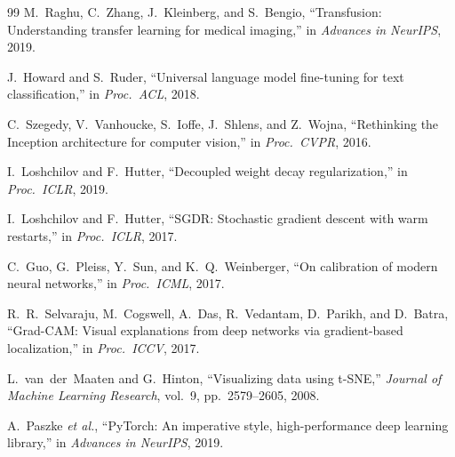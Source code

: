 \begin{thebibliography}{99}
 M.~Raghu, C.~Zhang, J.~Kleinberg, and S.~Bengio, ``Transfusion: Understanding transfer
learning for medical imaging,'' in \emph{Advances in NeurIPS}, 2019.

 J.~Howard and S.~Ruder, ``Universal language model fine-tuning for text classification,'' in
\emph{Proc.\ ACL}, 2018.

 C.~Szegedy, V.~Vanhoucke, S.~Ioffe, J.~Shlens, and Z.~Wojna, ``Rethinking the Inception
architecture for computer vision,'' in \emph{Proc.\ CVPR}, 2016.

 I.~Loshchilov and F.~Hutter, ``Decoupled weight decay regularization,'' in \emph{Proc.\ ICLR},
2019.

 I.~Loshchilov and F.~Hutter, ``SGDR: Stochastic gradient descent with warm restarts,'' in
\emph{Proc.\ ICLR}, 2017.

 C.~Guo, G.~Pleiss, Y.~Sun, and K.~Q.~Weinberger, ``On calibration of modern neural networks,''
in \emph{Proc.\ ICML}, 2017.

 R.~R.~Selvaraju, M.~Cogswell, A.~Das, R.~Vedantam, D.~Parikh, and D.~Batra, ``Grad-CAM: Visual
explanations from deep networks via gradient-based localization,'' in \emph{Proc.\ ICCV}, 2017.

 L.~van~der~Maaten and G.~Hinton, ``Visualizing data using t-SNE,'' \emph{Journal of Machine
Learning Research}, vol.~9, pp.~2579--2605, 2008.

 A.~Paszke \emph{et al.}, ``PyTorch: An imperative style, high-performance deep learning
library,'' in \emph{Advances in NeurIPS}, 2019.

\end{thebibliography}
